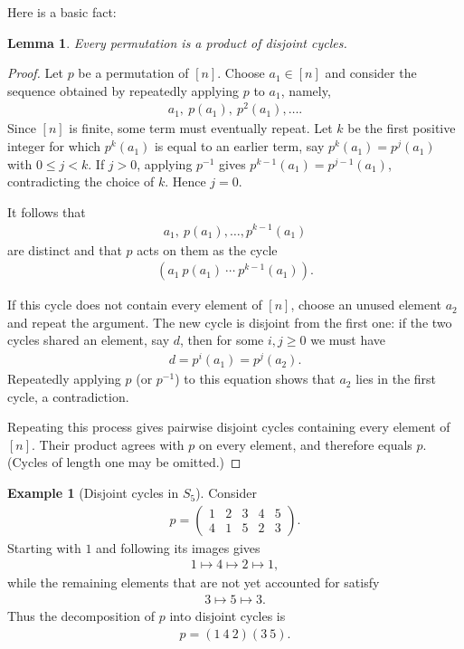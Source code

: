 \documentclass[reqno,11pt]{amsart}
\theoremstyle{definition}
\newtheorem{example}{Example}[section]
\theoremstyle{plain}
\newtheorem{lemma}{Lemma}[section]
\theoremstyle{remark}
\numberwithin{equation}{section}
\newcommand{\be}{\begin{eqnarray}}
\newcommand{\ee}{\end{eqnarray}}
\begin{document}
Here is a basic fact:

\begin{lemma} 
Every permutation is a product of disjoint cycles. \end{lemma}

\begin{proof}
Let $p$ be a permutation of $[n]$. Choose $a_1\in[n]$ and consider the sequence obtained by repeatedly
applying $p$ to $a_1$, namely,
\be
a_1,\ p(a_1),\ p^2(a_1),\ldots.
\ee
Since $[n]$ is finite, some term must eventually repeat. Let $k$ be the first
positive integer for which $p^k(a_1)$ is equal to an earlier term, say
$p^k(a_1)=p^j(a_1)$ with $0\leq j<k$. If $j>0$, applying $p^{-1}$ gives
$p^{k-1}(a_1)=p^{j-1}(a_1)$, contradicting the choice of $k$. Hence $j=0$.

It follows that
\be
a_1,\ p(a_1),\ldots,p^{k-1}(a_1)
\ee
are distinct and that $p$ acts on them as the cycle
\be
(a_1\ p(a_1)\ \cdots\ p^{k-1}(a_1)).
\ee

If this cycle does not contain every element of $[n]$, choose an unused
element $a_2$ and repeat the argument. The new cycle is disjoint from the
first one: if the two cycles shared an element, say $d$, then for some $i, j \geq 0$ we must have  \be d=p^i(a_1) = p^j(a_2). \ee
Repeatedly applying $p$ (or $p^{-1}$) to this equation shows that
$a_2$ lies in the first cycle, a contradiction.

Repeating this process gives pairwise disjoint cycles containing
every element of $[n]$. Their product agrees with $p$ on every element, and
therefore equals $p$. (Cycles of length one may be omitted.)

\end{proof}

\begin{example}[Disjoint cycles in $S_5$]
Consider
\be
p=
\begin{pmatrix}
1&2&3&4&5\\
4&1&5&2&3
\end{pmatrix}.
\ee
Starting with $1$ and following its images gives
\be
1\longmapsto4\longmapsto2\longmapsto1,
\ee
while the remaining elements that are not yet accounted for satisfy
\be
3\longmapsto5\longmapsto3.
\ee
Thus the decomposition of $p$ into disjoint cycles is
\be
p=(1\ 4\ 2)(3\ 5).
\ee

\end{example}
\end{document}
